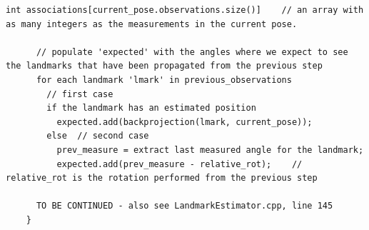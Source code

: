 {\begin{lstlisting}[frame=shadowbox,breaklines]
      int associations[current_pose.observations.size()]	// an array with as many integers as the measurements in the current pose.
      
      // populate 'expected' with the angles where we expect to see the landmarks that have been propagated from the previous step
      for each landmark 'lmark' in previous_observations
      	// first case
      	if the landmark has an estimated position
          expected.add(backprojection(lmark, current_pose));
        else  // second case
          prev_measure = extract last measured angle for the landmark;
          expected.add(prev_measure - relative_rot);	// relative_rot is the rotation performed from the previous step
      
      TO BE CONTINUED - also see LandmarkEstimator.cpp, line 145
    }
  \end{lstlisting}
}
